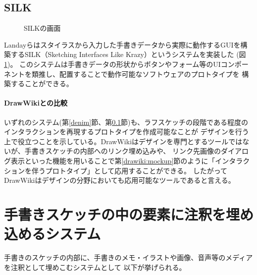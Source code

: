 \subsection{SILK}
\label{silk}

\begin{figure}[H]
    \centering
    \caption{SILKの画面}
    \label{fig:silk}
\end{figure}

Landayらはスタイラスから入力した手書きデータから実際に動作するGUIを構築するSILK（Sketching Interfaces Like Krazy）というシステムを実装した
\cite{Landay2001SketchingIT}(図\ref{fig:silk})。
このシステムは手書きデータの形状からボタンやフォーム等のUIコンポーネントを類推し、配置することで動作可能なソフトウェアのプロトタイプを
構築することができる。

\paragraph*{DrawWikiとの比較}
いずれのシステム(第\ref{denim}節、第\ref{silk}節)も、ラフスケッチの段階である程度のインタラクションを再現するプロトタイプを作成可能なことが
デザインを行う上で役立つことを示している。DrawWikiはデザインを専門とするツールではないが、手書きスケッチの内部へのリンク埋め込みや、
リンク先画像のダイアログ表示といった機能を用いることで第\ref{drawiki:mockup}節のように「インタラクションを伴うプロトタイプ」として応用することができる。
したがってDrawWikiはデザインの分野においても応用可能なツールであると言える。

\section{手書きスケッチの中の要素に注釈を埋め込めるシステム}
手書きのスケッチの内部に、手書きのメモ・イラストや画像、音声等のメディアを注釈として埋めこむシステムとして
以下が挙げられる。

